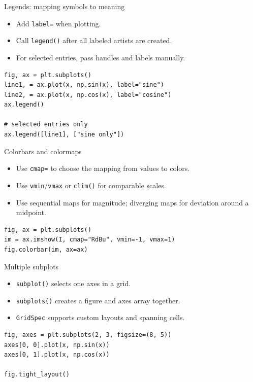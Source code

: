 \documentclass[aspectratio=43,11pt]{beamer}
\begin{document}
\begin{frame}[fragile]{Legends: mapping symbols to meaning}
\begin{itemize}
  \item Add \texttt{label=} when plotting.
  \item Call \texttt{legend()} after all labeled artists are created.
  \item For selected entries, pass handles and labels manually.
\end{itemize}

\begin{lstlisting}
fig, ax = plt.subplots()
line1, = ax.plot(x, np.sin(x), label="sine")
line2, = ax.plot(x, np.cos(x), label="cosine")
ax.legend()

# selected entries only
ax.legend([line1], ["sine only"])
\end{lstlisting}
\end{frame}

\begin{frame}[fragile]{Colorbars and colormaps}
\begin{itemize}
  \item Use \texttt{cmap=} to choose the mapping from values to colors.
  \item Use \texttt{vmin}/\texttt{vmax} or \texttt{clim()} for comparable scales.
  \item Use sequential maps for magnitude; diverging maps for deviation around a midpoint.
\end{itemize}

\begin{lstlisting}
fig, ax = plt.subplots()
im = ax.imshow(I, cmap="RdBu", vmin=-1, vmax=1)
fig.colorbar(im, ax=ax)
\end{lstlisting}
\end{frame}

\begin{frame}[fragile]{Multiple subplots}
\begin{itemize}
  \item \texttt{subplot()} selects one axes in a grid.
  \item \texttt{subplots()} creates a figure and axes array together.
  \item \texttt{GridSpec} supports custom layouts and spanning cells.
\end{itemize}

\begin{lstlisting}
fig, axes = plt.subplots(2, 3, figsize=(8, 5))
axes[0, 0].plot(x, np.sin(x))
axes[0, 1].plot(x, np.cos(x))

fig.tight_layout()
\end{lstlisting}
\end{frame}
\end{document}
